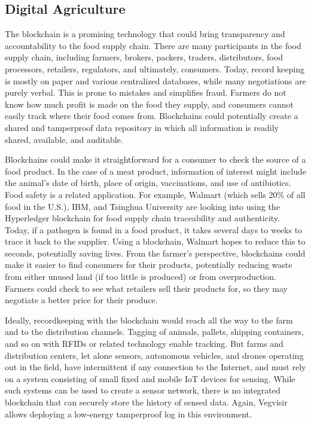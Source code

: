 \documentclass[conference, letterpaper]{IEEEtran}
\begin{document}
\subsection{Digital Agriculture}

The blockchain is a promising technology that could bring transparency and accountability to the food supply chain.  There are many participants in the food supply chain, including farmers, brokers, packers, traders, distributors, food processors, retailers, regulators, and ultimately, consumers.  Today, record keeping is mostly on paper and various centralized databases, while many negotiations are purely verbal.  This is prone to mistakes and simplifies fraud.  Farmers do not know how much profit is made on the food they supply, and consumers cannot easily track where their food comes from.  Blockchains could potentially create a shared and tamperproof data repository in which all information is readily shared, available, and auditable.

Blockchains could make it straightforward for a consumer to check the source of a food product.  In the case of a meat product, information of interest might include the animal's date of birth, place of origin, vaccinations, and use of antibiotics.  Food safety is a related application.  For example, Walmart (which sells 20\% of all food in the U.S.), IBM, and Tsinghua University are looking into using the Hyperledger blockchain \cite{cachin2016architecture} for food supply chain traceability and authenticity.  Today, if a pathogen is found in a food product, it takes several days to weeks to trace it back to the supplier. Using a blockchain, Walmart hopes to reduce this to seconds, potentially saving lives. From the farmer's perspective, blockchains could make it easier to find consumers for their products, potentially reducing waste from either unused land (if too little is produced) or from overproduction.  Farmers could check to see what retailers sell their products for, so they may negotiate a better price for their produce.

Ideally, recordkeeping with the blockchain would reach all the way to the farm and to the distribution channels.  Tagging of animals, pallets, shipping containers, and so on with RFIDs or related technology enable tracking.  But farms and distribution centers, let alone sensors, autonomous vehicles, and drones operating out in the field, have intermittent if any connection to the Internet, and must rely on a system consisting of small fixed and mobile IoT devices for sensing. While such systems can be used to create a sensor network, there is no integrated blockchain that can securely store the history of sensed data.  Again, Vegvisir allows deploying a low-energy tamperproof log in this environment.
\end{document}

